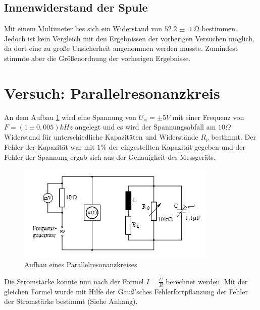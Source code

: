 \subsection{Innenwiderstand der Spule}
Mit einem Multimeter lies sich ein Widerstand von $ \SI{52.2(1)}{\ohm} $ bestimmen. Jedoch ist kein Vergleich mit den Ergebnissen der vorherigen Versuchen möglich, da dort eine zu große Unsicherheit angenommen werden musste. Zumindest stimmte aber die Größenordnung der vorherigen Ergebnisse.
\section{Versuch: Parallelresonanzkreis}
An dem Aufbau \ref{fig:aufbauparallel} wird eine Spannung von $U_\approx=\pm 5V$ mit einer Frequenz von $F=(1 \pm 0,005) kHz$ angelegt und es wird der Spannungsabfall am $10\Omega$ Widerstand für unterschiedliche Kapazitäten und Widerstände $R_p$ bestimmt. Der Fehler der Kapazität war mit $1\% $ der eingestellten Kapazität gegeben und der Fehler der Spannung ergab sich aus der Genauigkeit des Messgeräts.
\begin{figure}[h]
  \centering
  \includegraphics[width=.9\textwidth]{Bauplanparall.png}
  \caption{Aufbau eines Parallelresonanzkreises}
  \label{fig:aufbauparallel}
\end{figure}
 Die Stromstärke konnte nun nach der Formel $I=\frac{U}{R}$ berechnet werden. Mit der gleichen Formel wurde mit Hilfe der Gauß'sches Fehlerfortpflanzung der Fehler der Stromstärke bestimmt (Siehe Anhang).
